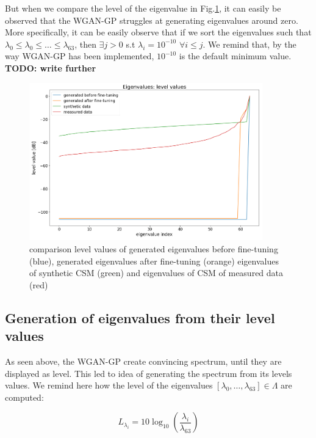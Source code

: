 \documentclass{article}
\begin{document}
But when we compare the level of the eigenvalue in Fig.\ref{fig:eval_WGANGP_sample_level}, it can easily be observed that the WGAN-GP struggles at generating eigenvalues around zero. More specifically, it can be easily observe that if we sort the eigenvalues such that $\lambda_0 \leq \lambda_0 \leq  \dots \leq \lambda_{63}$, then $\exists j>0$ s.t $\lambda_i = 10^{-10}$ $\forall i \leq j$. We remind that, by the way WGAN-GP has been implemented, $10^{-10}$ is the default minimum value. \textbf{TODO: write further}

\begin{figure}
    \centering
    \includegraphics[width=0.9\textwidth]{../figs/eval_WGANGP_sample_level.png}    
    \caption{comparison level values of generated eigenvalues before fine-tuning (blue), generated eigenvalues after fine-tuning (orange) eigenvalues of synthetic CSM (green) and eigenvalues of CSM of measured data (red)}
    \label{fig:eval_WGANGP_sample_level}
\end{figure} 


\subsection{Generation of eigenvalues from their level values}

As seen above, the WGAN-GP create convincing spectrum, until they are displayed as level. This led to idea of generating the spectrum from its levels values. We remind here how the level of the eigenvalues $[\lambda_0, \dots, \lambda_{63}] \in \Lambda$ are computed:

\begin{equation}
    L_{\lambda_i} = 10 \log_{10}(\frac{\lambda_i}{\lambda_{63}})
\end{equation}
\end{document}
